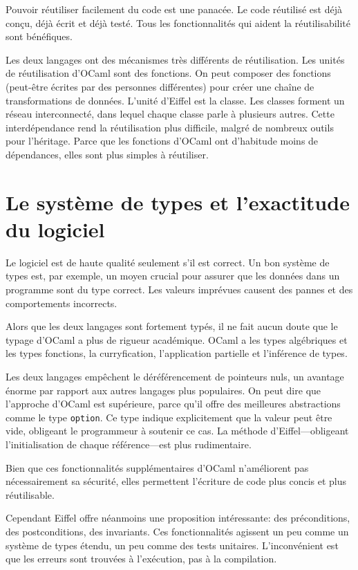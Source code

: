 \documentclass[french]{report}
\begin{document}
Pouvoir réutiliser facilement du code est une panacée. Le code réutilisé est déjà conçu, déjà écrit et déjà testé. Tous les fonctionnalités qui aident la réutilisabilité sont bénéfiques.

Les deux langages ont des mécanismes très différents de réutilisation. Les unités de réutilisation d'OCaml sont des fonctions. On peut composer des fonctions (peut-être écrites par des personnes différentes) pour créer une chaîne de transformations de données. L'unité d'Eiffel est la classe. Les classes forment un réseau interconnecté, dans lequel chaque classe parle à plusieurs autres. Cette interdépendance rend la réutilisation plus difficile, malgré de nombreux outils pour l'héritage. Parce que les fonctions d'OCaml ont d'habitude moins de dépendances, elles sont plus simples à réutiliser.

\section{Le système de types et l'exactitude du logiciel}

Le logiciel est de haute qualité seulement s'il est correct. Un bon système de types est, par exemple, un moyen crucial pour assurer que les données dans un programme sont du type correct. Les valeurs imprévues causent des pannes et des comportements incorrects.

Alors que les deux langages sont fortement typés, il ne fait aucun doute que le typage d'OCaml a plus de rigueur académique. OCaml a les types algébriques et les types fonctions, la curryfication, l'application partielle et l'inférence de types.

Les deux langages empêchent le déréférencement de pointeurs nuls, un avantage énorme par rapport aux autres langages plus populaires. On peut dire que l'approche d'OCaml est supérieure, parce qu'il offre des meilleures abstractions comme le type \texttt{option}. Ce type indique explicitement que la valeur peut être vide, obligeant le programmeur à soutenir ce cas. La méthode d'Eiffel---obligeant l'initialisation de chaque référence---est plus rudimentaire.

Bien que ces fonctionnalités supplémentaires d'OCaml n'améliorent pas nécessairement sa sécurité, elles permettent l'écriture de code plus concis et plus réutilisable.

Cependant Eiffel offre néanmoins une proposition intéressante: des préconditions, des postconditions, des invariants. Ces fonctionnalités agissent un peu comme un système de types étendu, un peu comme des tests unitaires. L'inconvénient est que les erreurs sont trouvées à l'exécution, pas à la compilation.
\end{document}
